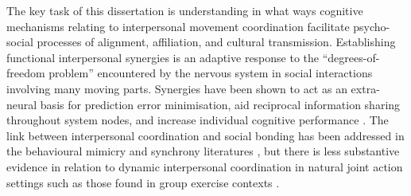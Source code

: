 \begin{CJK}{UTF8}{gbsn}
{%
The key task of this dissertation is understanding in what ways cognitive mechanisms relating to interpersonal movement coordination facilitate psycho-social processes of alignment, affiliation, and cultural transmission\citep{Marsh2009}.  Establishing functional interpersonal synergies is an adaptive response to the ``degrees-of-freedom problem'' encountered by the nervous system in social interactions involving many moving parts.  Synergies have been shown to act as an extra-neural basis for prediction error minimisation, aid reciprocal information sharing throughout system nodes, and increase individual cognitive performance \citep{Schmidt2016}.  The link between interpersonal coordination and social bonding has been addressed in the behavioural mimicry and synchrony literatures \citep[e.g.,][]{Wheatley2012,Launay2016,Mogan2017}, but there is less substantive evidence in relation to dynamic interpersonal coordination in natural joint action settings such as those found in group exercise contexts \citep{Marsh2009,Miles2009,Lumsden2012}.

}
\end{CJK}
